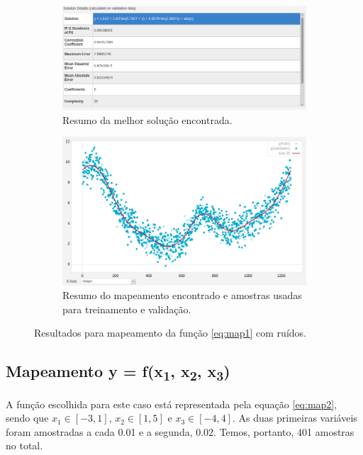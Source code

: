 \begin{figure}[h!]
		\begin{subfigure}{.5\textwidth}
		  \centering
		  \includegraphics[width=1\linewidth]{image/best_solucao_map1_r_info}
		  \caption{\centering Resumo da melhor solução encontrada.}
		  \label{fig:map1_best_c_ruido} 
		\end{subfigure} %
		\begin{subfigure}{.45\textwidth}
		  \centering
		  \includegraphics[width=1\linewidth]{image/solucoes_map1_r}
		  \caption{\centering Resumo do mapeamento encontrado e amostras usadas para
		  treinamento e validação.}
		  \label{fig:map1_c_ruido} 
		\end{subfigure}
	
	\caption{Resultados para mapeamento da função \ref{eq:map1} com ruídos.}
	\end{figure}
	
	\FloatBarrier

\subsection {Mapeamento y = f(x\textsubscript{1}, x\textsubscript{2},
x\textsubscript{3})}

A função escolhida para este caso está representada pela equação \ref{eq:map2},
sendo que \(x_1 \in [-3, 1]\), \(x_2 \in [1, 5]\) e \(x_3 \in [-4, 4]\). As duas
primeiras variáveis foram amostradas a cada 0.01 e a segunda, 0.02. Temos,
portanto, 401 amostras no total.

